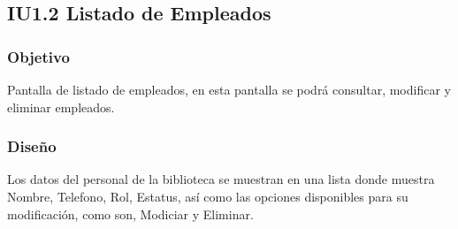 \newpage
\subsection{IU1.2 Listado de Empleados}

\subsubsection{Objetivo}
	Pantalla de listado de empleados, en esta pantalla se podrá consultar, modificar y eliminar empleados.  

\subsubsection{Diseño}
	Los datos del personal de la biblioteca se muestran en una lista donde muestra Nombre, Telefono, Rol, Estatus, así como las opciones disponibles para su modificación, como son, Modiciar y Eliminar. 

